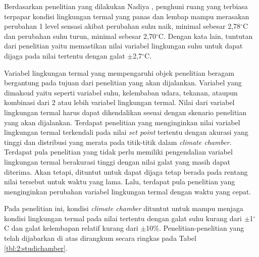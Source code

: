 Berdasarkan penelitian yang dilakukan Nadiya \cite{skripsiMuna}, penghuni ruang yang terbiasa terpapar kondisi lingkungan termal yang panas dan lembap mampu merasakan perubahan 1 level sensasi akibat perubahan suhu naik, minimal sebesar 2,78$^{\circ}$C dan perubahan suhu turun, minimal sebesar 2,70$^{\circ}$C. Dengan kata lain, tuntutan dari penelitian yaitu memastikan nilai variabel lingkungan suhu untuk dapat dijaga pada nilai tertentu dengan galat $\pm$2,7$^{\circ}$C. 

Variabel lingkungan termal yang mempengaruhi objek penelitian beragam bergantung pada tujuan dari penelitian yang akan dijalankan. Variabel yang dimaksud yaitu seperti variabel suhu, kelembaban udara, tekanan, ataupun kombinasi dari 2 atau lebih variabel lingkungan termal. Nilai dari variabel lingkungan termal harus dapat dikendalikan sesuai dengan skenario penelitian yang akan dijalankan. Terdapat penelitian yang menginginkan nilai variabel lingkungan termal terkendali pada nilai \textit{set point} tertentu dengan akurasi yang tinggi dan distribusi yang merata pada titik-titik dalam \textit{climate chamber}. Terdapat pula penelitian yang tidak perlu memiliki pengendalian variabel lingkungan termal berakurasi tinggi dengan nilai galat yang masih dapat diterima. Akan tetapi, dituntut untuk dapat dijaga tetap berada pada rentang nilai tersebut untuk waktu yang lama. Lalu, terdapat pula penelitian yang menginginkan perubahan variabel lingkungan termal dengan waktu yang cepat. 

Pada penelitian ini, kondisi \textit{climate chamber} dituntut untuk mampu menjaga kondisi lingkungan termal pada nilai tertentu dengan galat suhu kurang dari $\pm$1$^{\circ}$C dan galat kelembapan relatif kurang dari $\pm$10\%. Penelitian-penelitian yang telah dijabarkan di atas dirangkum secara ringkas pada Tabel \ref{tbl:2:studichamber}. 

